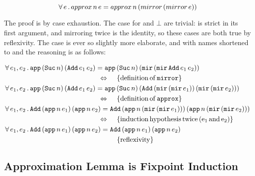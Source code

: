 \begin{equation*}
\forall \, e \, . \,  approx \, n \, e = approx \, n \, (mirror \, (mirror \, e))
\end{equation*}

The proof is by case exhaustion. The case for  and $\bot$
are trivial:  is strict in its first argument, and
mirroring  twice is the identity, so these cases are both
true by reflexivity. The  case is ever so slightly more
elaborate, and with names shortened to  and  the
reasoning is as follows:

\newcommand{\Adds}[2]{\hs{Add} \, #1 e_1 #2 \, #1 e_2 #2}
\newcommand{\Approxn}[0]{\hs{app} \, n \,}
\newcommand{\ApproxSucn}[0]{\hs{app} \, (\hs{Suc} \, n) \,}
\newcommand{\mirmir}[0]{\hs{mir} \, (\hs{mir} \, }
\begin{align*}
\faa{e_1}{e_2}&  \ApproxSucn (\Adds{}{})  = \ApproxSucn (\mirmir \Adds{}{} ))                                                                   \\
                                                                                 \desclra{\defof{\hs{mirror}}}                                   \\
\faa{e_1}{e_2}&  \ApproxSucn (\Adds{}{})  = \ApproxSucn (\Adds{(\mirmir}{))})                                                                    \\
                                                                                \desclra{\defof{\hs{approx}}}                                    \\
\faa{e_1}{e_2}&  \Adds{(\Approxn}{)}      = \Adds{(\Approxn(\mirmir}{)))}                                                                        \\
                                                                                \desclra{induction \, hypothesis \, twice \, (e_1 \, and \, e_2)} \\
\faa{e_1}{e_2}&  \Adds{(\Approxn}{)}      = \Adds{(\Approxn}{)}                                                                                  \\
                                                                                \desca{reflexivity}                                              \\
\end{align*}

\subsection{Approximation Lemma is Fixpoint Induction}


